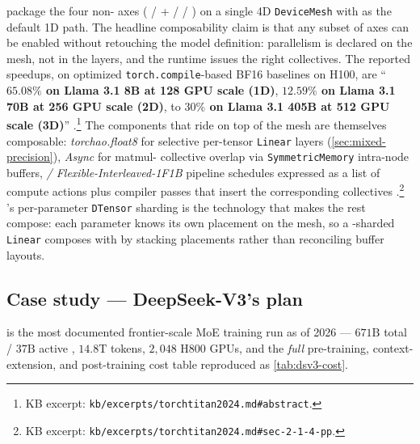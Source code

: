 \citet{torchtitan2024} package the four non- axes ( / + /  /
) on a single 4D \texttt{DeviceMesh} with  as the default
1D path. The headline composability claim is that any subset of axes
can be enabled without retouching the model definition: parallelism is
declared on the mesh, not in the layers, and the runtime issues the
right collectives. The reported speedups, on optimized
\texttt{torch.compile}-based BF16 baselines on H100, are
``\textbf{$65.08\%$ on Llama 3.1 8B at 128 GPU scale (1D)},
\textbf{$12.59\%$ on Llama 3.1 70B at 256 GPU scale (2D)}, to
\textbf{$30\%$ on Llama 3.1 405B at 512 GPU scale (3D)}''
\citep[abstract]{torchtitan2024}.\footnote{KB excerpt:
\texttt{kb/excerpts/torchtitan2024.md\#abstract}.} The components that
ride on top of the mesh are themselves composable:
\emph{torchao.float8} for selective per-tensor  \texttt{Linear}
layers (\cref{sec:mixed-precision}), \emph{Async } for matmul-
collective overlap via \texttt{SymmetricMemory} intra-node buffers,
\emph{ / Flexible-Interleaved-1F1B} pipeline schedules
expressed as a list of compute actions plus compiler passes that insert
the corresponding collectives \citep[\S 2.1.4]{torchtitan2024}.\footnote{KB
excerpt: \texttt{kb/excerpts/torchtitan2024.md\#sec-2-1-4-pp}.}
's per-parameter \texttt{DTensor} sharding is the technology that
makes the rest compose: each parameter knows its own placement on the
mesh, so a -sharded \texttt{Linear} composes with  by stacking
placements rather than reconciling buffer layouts. 

\subsection{Case study --- DeepSeek-V3's plan}
\label{sec:dt-deepseek}

 \citep{deepseek-v3} is the most documented frontier-scale
MoE training run as of 2026 --- $671\text{B}$ total / $37\text{B}$
active , $14.8\text{T}$ tokens, $2{,}048$ H800 GPUs, and the
\emph{full} pre-training, context-extension, and post-training cost
table reproduced as \cref{tab:dsv3-cost}.

